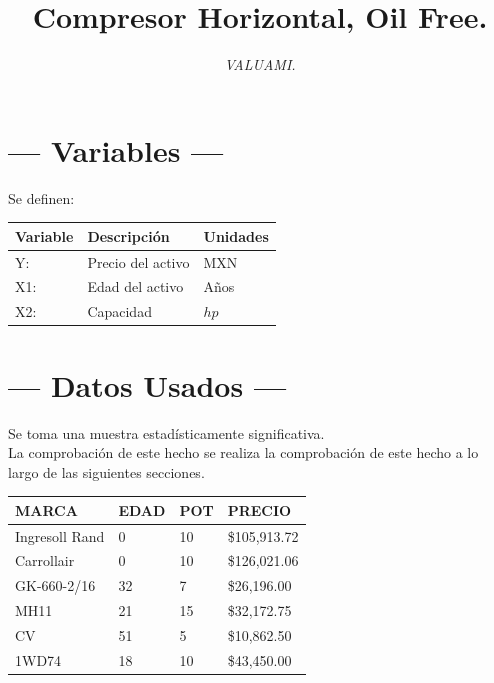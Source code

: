 \documentclass{article}
\title{\sc Compresor Horizontal, Oil Free.}
\author{\it VALUAMI.}
\begin{document}
\maketitle

\section{\centering --- Variables ---} %
Se definen:
\begin{center}
  \begin{tabular}{|l|l|l|}
    \hline 
    Variable & Descripción   & Unidades\\ \hline 
    Y:  & Precio del activo  & MXN \\ \hline 
    X1: & Edad del activo    & Años \\ \hline 
		X2: & Capacidad  & \(hp\) \\ \hline 
  \end{tabular}
\end{center} 

\section{\centering --- Datos Usados ---} %
Se toma una muestra estadísticamente significativa. \\ 
La comprobación de este hecho se realiza la comprobación de este hecho a lo largo de las siguientes secciones.
\begin{center}
	\begin{tabular}{*{4}{|p{3cm}}|}
		\hline 
MARCA          & EDAD  & POT  & PRECIO\\ \hline
Ingresoll Rand & 0     & 10   & \$105,913.72\\ \hline
Carrollair     & 0     & 10   & \$126,021.06\\ \hline
GK-660-2/16    & 32    & 7    & \$26,196.00\\ \hline
MH11           & 21    & 15   & \$32,172.75\\ \hline
CV             & 51    & 5    & \$10,862.50\\ \hline
1WD74          & 18    & 10   & \$43,450.00\\ \hline
	\end{tabular}
\end{center}
\end{document}
